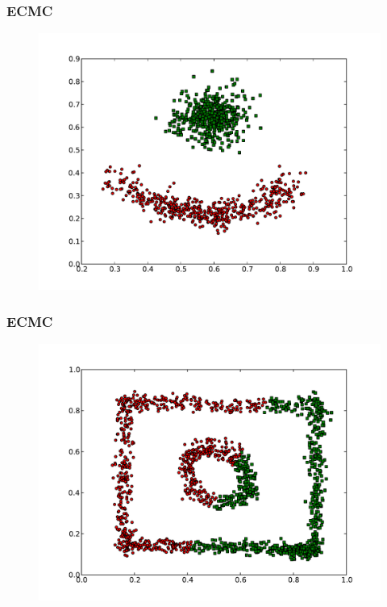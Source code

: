 \documentclass{beamer}
\begin{document}
\begin{frame}
\frametitle{ECMC}
    \begin{figure}[]
    \includegraphics[scale=0.3]{ECMC_red-blue-clusters.pdf}
    \end{figure}
\end{frame}

\begin{frame}
\frametitle{ECMC}
    \begin{figure}[]
    \includegraphics[scale=0.3]{ECMC_circle-weird.pdf}
    \end{figure}
\end{frame}
\end{document}
